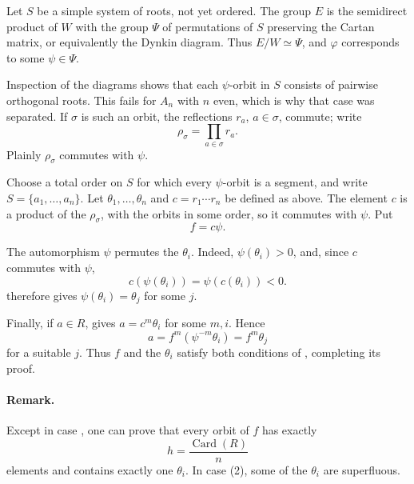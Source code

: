 \begin{center}
\end{center}

Let \(S\) be a simple system of roots, not yet ordered. The group
\(E\) is the semidirect product of \(W\) with the group
\(\Psi\) of permutations of \(S\) preserving the Cartan matrix,
or equivalently the Dynkin diagram. Thus \(E/W\simeq\Psi\), and
\(\varphi\) corresponds to some \(\psi\in\Psi\).

Inspection of the diagrams shows that each \(\psi\)-orbit in
\(S\) consists of pairwise orthogonal roots. This fails for
\(A_n\) with \(n\) even, which is why that case was separated.
If \(\sigma\) is such an orbit, the reflections \(r_a\),
\(a\in\sigma\), commute; write
\[
  \rho_\sigma=\prod_{a\in\sigma}r_a.
\]
Plainly \(\rho_\sigma\) commutes with \(\psi\).

Choose a total order on \(S\) for which every \(\psi\)-orbit is a
segment, and write \(S=\{a_1,\ldots,a_n\}\). Let
\(\theta_1,\ldots,\theta_n\) and
\(c=r_1\cdots r_n\) be defined as above. The element \(c\) is a
product of the \(\rho_\sigma\), with the orbits in some order, so
it commutes with \(\psi\). Put
\[
  f=c\psi.
\]

The automorphism \(\psi\) permutes the \(\theta_i\). Indeed,
\(\psi(\theta_i)>0\), and, since \(c\) commutes with \(\psi\),
\[
  c(\psi(\theta_i))=\psi(c(\theta_i))<0.
\]
\textup{} therefore gives
\(\psi(\theta_i)=\theta_j\) for some \(j\).

Finally, if \(a\in R\),  gives
\(a=c^m\theta_i\) for some \(m,i\). Hence
\[
  a=f^m(\psi^{-m}\theta_i)=f^m\theta_j
\]
for a suitable \(j\). Thus \(f\) and the \(\theta_i\) satisfy
both conditions of , completing its proof.

\paragraph{\textbf{Remark.}}
Except in case \textup{}, one can prove that every orbit of
\(f\) has exactly
\[
  h=\frac{\operatorname{Card}(R)}{n}
\]
elements and contains exactly one \(\theta_i\). In case
\textup{(2)}, some of the \(\theta_i\) are superfluous.




